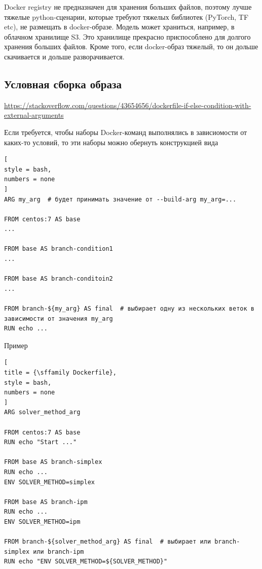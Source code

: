 \documentclass[%
	11pt,
	a4paper,
	utf8,
		]{article}
\begin{document}
Docker registry не предназначен для хранения больших файлов, поэтому лучше тяжелые python-сценарии, которые требуют тяжелых библиотек (PyTorch, TF etc), не размещать в docker-образе. Модель может храниться, например, в облачном хранилище S3. Это хранилище прекрасно приспособлено для долгого хранения больших файлов. Кроме того, если docker-образ тяжелый, то он дольше скачивается и дольше разворачивается.

\subsection{Условная сборка образа}

\url{https://stackoverflow.com/questions/43654656/dockerfile-if-else-condition-with-external-arguments}

Если требуется, чтобы наборы Docker-команд выполнялись в зависиомости от каких-то условий, то эти наборы можно обернуть конструкцией вида
\begin{lstlisting}[
style = bash,
numbers = none
]
ARG my_arg  # будет принимать значение от --build-arg my_arg=...

FROM centos:7 AS base
...

FROM base AS branch-condition1
...

FROM base AS branch-conditoin2
...

FROM branch-${my_arg} AS final  # выбирает одну из нескольких веток в зависимости от значения my_arg
RUN echo ...
\end{lstlisting}

Пример
\begin{lstlisting}[
title = {\sffamily Dockerfile},
style = bash,
numbers = none
]
ARG solver_method_arg

FROM centos:7 AS base
RUN echo "Start ..."

FROM base AS branch-simplex
RUN echo ...
ENV SOLVER_METHOD=simplex

FROM base AS branch-ipm
RUN echo ...
ENV SOLVER_METHOD=ipm

FROM branch-${solver_method_arg} AS final  # выбирает или branch-simplex или branch-ipm
RUN echo "ENV SOLVER_METHOD=${SOLVER_METHOD}"
\end{lstlisting}
\end{document}

